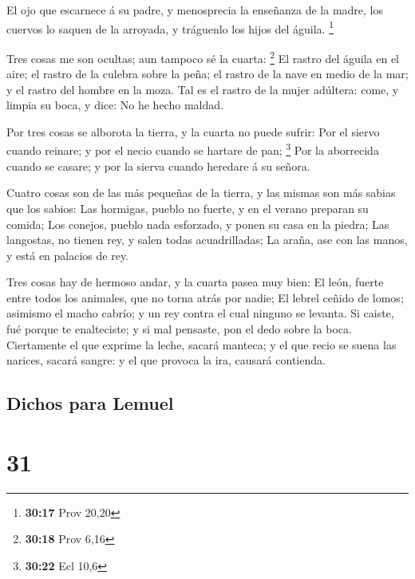  El ojo que escarnece á su padre, y menosprecia la
enseñanza de la madre, los cuervos lo saquen de la arroyada, y tráguenlo
los hijos del águila. \footnote{\textbf{30:17} Prov 20,20}

 Tres cosas me son ocultas; aun tampoco sé la cuarta:
\footnote{\textbf{30:18} Prov 6,16}  El rastro del águila
en el aire; el rastro de la culebra sobre la peña; el rastro de la nave
en medio de la mar; y el rastro del hombre en la moza. 
Tal es el rastro de la mujer adúltera: come, y limpia su boca, y dice:
No he hecho maldad.

 Por tres cosas se alborota la tierra, y la cuarta no
puede sufrir:  Por el siervo cuando reinare; y por el
necio cuando se hartare de pan; \footnote{\textbf{30:22} Ecl 10,6}
 Por la aborrecida cuando se casare; y por la sierva
cuando heredare á su señora.

 Cuatro cosas son de las más pequeñas de la tierra, y las
mismas son más sabias que los sabios:  Las hormigas,
pueblo no fuerte, y en el verano preparan su comida;  Los
conejos, pueblo nada esforzado, y ponen su casa en la piedra;
 Las langostas, no tienen rey, y salen todas
acuadrilladas;  La araña, ase con las manos, y está en
palacios de rey.

 Tres cosas hay de hermoso andar, y la cuarta pasea muy
bien:  El león, fuerte entre todos los animales, que no
torna atrás por nadie;  El lebrel ceñido de lomos;
asimismo el macho cabrío; y un rey contra el cual ninguno se levanta.
 Si caiste, fué porque te enalteciste; y si mal pensaste,
pon el dedo sobre la boca.  Ciertamente el que exprime la
leche, sacará manteca; y el que recio se suena las narices, sacará
sangre: y el que provoca la ira, causará contienda.

\hypertarget{dichos-para-lemuel}{%
\subsection{Dichos para Lemuel}\label{dichos-para-lemuel}}

\hypertarget{section-30}{%
\section{31}\label{section-30}}


